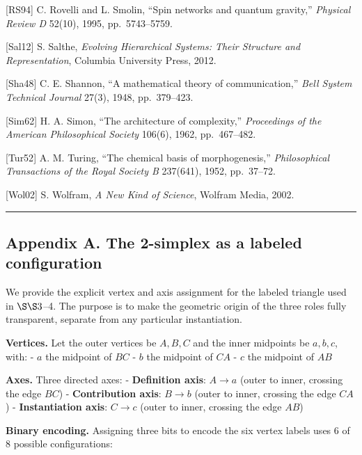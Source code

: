 \documentclass[12pt]{article}
\begin{document}
{[}RS94{]} C. Rovelli and L. Smolin, ``Spin networks and quantum
gravity,'' \emph{Physical Review D} 52(10), 1995, pp.~5743--5759.

{[}Sal12{]} S. Salthe, \emph{Evolving Hierarchical Systems: Their
Structure and Representation}, Columbia University Press, 2012.

{[}Sha48{]} C. E. Shannon, ``A mathematical theory of communication,''
\emph{Bell System Technical Journal} 27(3), 1948, pp.~379--423.

{[}Sim62{]} H. A. Simon, ``The architecture of complexity,''
\emph{Proceedings of the American Philosophical Society} 106(6), 1962,
pp.~467--482.

{[}Tur52{]} A. M. Turing, ``The chemical basis of morphogenesis,''
\emph{Philosophical Transactions of the Royal Society B} 237(641), 1952,
pp.~37--72.

{[}Wol02{]} S. Wolfram, \emph{A New Kind of Science}, Wolfram Media,
2002.

\begin{center}\rule{0.5\linewidth}{0.5pt}\end{center}

\subsection{Appendix A. The 2-simplex as a labeled
configuration}\label{appendix-a.-the-2-simplex-as-a-labeled-configuration}

We provide the explicit vertex and axis assignment for the labeled
triangle used in \(\S\S 3\)--4. The purpose is to make the geometric
origin of the three roles fully transparent, separate from any
particular instantiation.

\textbf{Vertices.} Let the outer vertices be \(A, B, C\) and the inner
midpoints be \(a, b, c\), with: - \(a\) the midpoint of \(BC\) - \(b\)
the midpoint of \(CA\) - \(c\) the midpoint of \(AB\)

\textbf{Axes.} Three directed axes: - \textbf{Definition axis}:
\(A \to a\) (outer to inner, crossing the edge \(BC\)) -
\textbf{Contribution axis}: \(B \to b\) (outer to inner, crossing the
edge \(CA\)) - \textbf{Instantiation axis}: \(C \to c\) (outer to inner,
crossing the edge \(AB\))

\textbf{Binary encoding.} Assigning three bits to encode the six vertex
labels uses 6 of 8 possible configurations:
\end{document}

